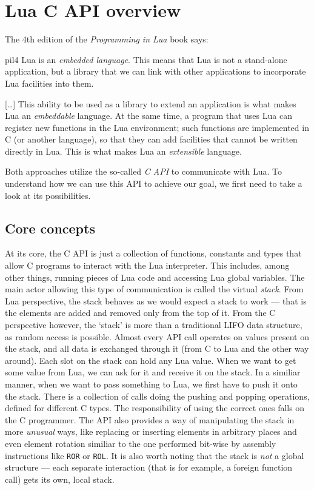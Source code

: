 \documentclass[polish, english]{iithesis}
\begin{document}
\chapter{Lua C API overview}
  The 4th edition of the \textit{Programming in Lua} book says:
  \begin{displaycquote}{pil4}
    Lua is an \textit{embedded language}. 
    This means that Lua is not a stand-alone application, but a library that we can link with other applications to incorporate Lua facilities into them.

    [\ldots] This ability to be used as a library to extend an application is what makes Lua an \textit{embeddable} language. 
    At the same time, a program that uses Lua can register new functions in the Lua environment; such functions are implemented in C (or another language), so that they can add facilities that cannot be written directly in Lua. 
    This is what makes Lua an \textit{extensible} language. 
  \end{displaycquote}
  Both approaches utilize the so-called \textit{C API} to communicate with Lua.
  To understand how we can use this API to achieve our goal, we first need to take a look at its possibilities.
  \section{Core concepts}
    At its core, the C API is just a collection of functions, constants and types that allow C programs to interact with the Lua interpreter.
    This includes, among other things, running pieces of Lua code and accessing Lua global variables.
    The main actor allowing this type of communication is called the virtual \textit{stack}.
    From Lua perspective, the stack behaves as we would expect a stack to work --- that is the elements are added and removed only from the top of it.
    From the C perspective however, the `stack' is more than a traditional LIFO data structure, as random access is possible. 
    Almost every API call operates on values present on the stack, and all data is exchanged through it (from C to Lua and the other way around).  
    Each slot on the stack can hold any Lua value.
    When we want to get some value from Lua, we can ask for it and receive it on the stack.
    In a similiar manner, when we want to pass something to Lua, we first have to push it onto the stack.
    There is a collection of calls doing the pushing and popping operations, defined for different C types.
    The responsibility of using the correct ones falls on the C programmer.
    The API also provides a way of manipulating the stack in more \textit{unusual} ways, like replacing or inserting elements in arbitrary places and even element rotation similiar to the one performed bit-wise by assembly instructions like \texttt{ROR} or \texttt{ROL}.
    It is also worth noting that the stack is \emph{not} a global structure --- each separate interaction (that is for example, a foreign function call) gets its own, local stack.
\end{document}
